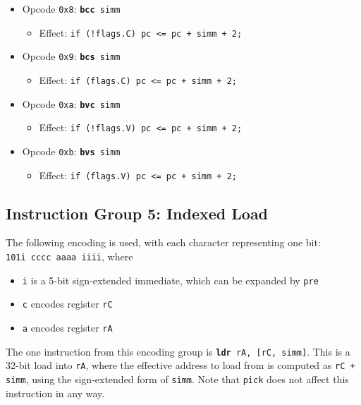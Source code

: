 \documentclass{article}
\begin{document}
\begin{itemize}
		\item Opcode \texttt{0x8}:
			\texttt{\textbf{bcc} simm}
		\begin{itemize}
			\item Effect:
				\texttt{if (!flags.C) pc <= pc + simm + 2;}
		\end{itemize}
		\item Opcode \texttt{0x9}:
			\texttt{\textbf{bcs} simm}
		\begin{itemize}
			\item Effect:
				\texttt{if (flags.C) pc <= pc + simm + 2;}
		\end{itemize}
		\item Opcode \texttt{0xa}:
			\texttt{\textbf{bvc} simm}
		\begin{itemize}
			\item Effect:
				\texttt{if (!flags.V) pc <= pc + simm + 2;}
		\end{itemize}
		\item Opcode \texttt{0xb}:
			\texttt{\textbf{bvs} simm}
		\begin{itemize}
			\item Effect:
				\texttt{if (flags.V) pc <= pc + simm + 2;}
		\end{itemize}
	\end{itemize}

	\doublespacing
	\subsection{Instruction Group 5:  Indexed Load}
	The following encoding is used, with each character representing one
	bit:  \\
	\texttt{101i cccc aaaa iiii}, where

	\singlespacing
	\begin{itemize}
		\item \texttt{i} is a 5-bit sign-extended immediate, which can
		be expanded by \texttt{pre}  
		\item \texttt{c} encodes register \texttt{rC}
		\item \texttt{a} encodes register \texttt{rA}
	\end{itemize}
	\doublespacing

	The one instruction from this encoding group is
	\texttt{\textbf{ldr} rA, [rC, simm]}.
	This is a 32-bit load into \texttt{rA}, where the effective address to
	load from is computed as \texttt{rC + simm}, using the sign-extended
	form of \texttt{simm}.  Note that \texttt{pick} does not affect this
	instruction in any way.
\end{document}
